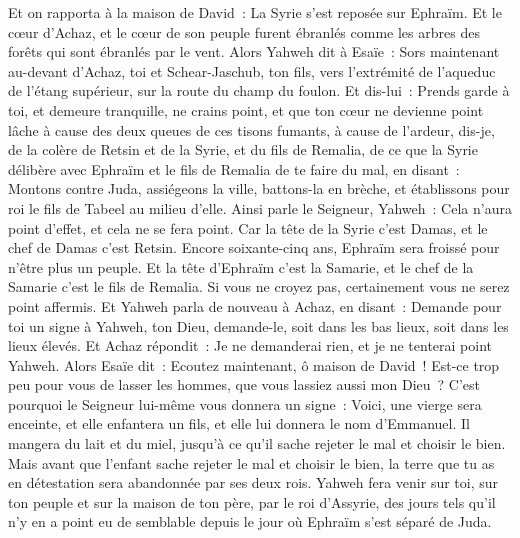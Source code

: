 \begin{multicols}{2}
Et on rapporta à la maison de David~: La Syrie s'est reposée sur Ephraïm. Et le cœur d'Achaz, et le cœur de son peuple furent ébranlés comme les arbres des forêts qui sont ébranlés par le vent.
Alors Yahweh dit à Esaïe~: Sors maintenant au-devant d'Achaz, toi et Schear-Jaschub, ton fils, vers l'extrémité de l'aqueduc de l'étang supérieur, sur la route du champ du foulon.
Et dis-lui~: Prends garde à toi, et demeure tranquille, ne crains point, et que ton cœur ne devienne point lâche à cause des deux queues de ces tisons fumants, à cause de l'ardeur, dis-je, de la colère de Retsin et de la Syrie, et du fils de Remalia,
de ce que la Syrie délibère avec Ephraïm et le fils de Remalia de te faire du mal, en disant~:
Montons contre Juda, assiégeons la ville, battons-la en brèche, et établissons pour roi le fils de Tabeel au milieu d'elle.
Ainsi parle le Seigneur, Yahweh~: Cela n'aura point d'effet, et cela ne se fera point.
Car la tête de la Syrie c'est Damas, et le chef de Damas c'est Retsin. Encore soixante-cinq ans, Ephraïm sera froissé pour n'être plus un peuple.
Et la tête d'Ephraïm c'est la Samarie, et le chef de la Samarie c'est le fils de Remalia. Si vous ne croyez pas, certainement vous ne serez point affermis.
Et Yahweh parla de nouveau à Achaz, en disant~:
Demande pour toi un signe à Yahweh, ton Dieu, demande-le, soit dans les bas lieux, soit dans les lieux élevés.
Et Achaz répondit~: Je ne demanderai rien, et je ne tenterai point Yahweh.
Alors Esaïe dit~: Ecoutez maintenant, ô maison de David~! Est-ce trop peu pour vous de lasser les hommes, que vous lassiez aussi mon Dieu~?
C'est pourquoi le Seigneur lui-même vous donnera un signe~: Voici, une vierge sera enceinte, et elle enfantera un fils, et elle lui donnera le nom d'Emmanuel.
Il mangera du lait et du miel, jusqu'à ce qu'il sache rejeter le mal et choisir le bien.
Mais avant que l'enfant sache rejeter le mal et choisir le bien, la terre que tu as en détestation sera abandonnée par ses deux rois.
Yahweh fera venir sur toi, sur ton peuple et sur la maison de ton père, par le roi d'Assyrie, des jours tels qu'il n'y en a point eu de semblable depuis le jour où Ephraïm s'est séparé de Juda.

\end{multicols}
